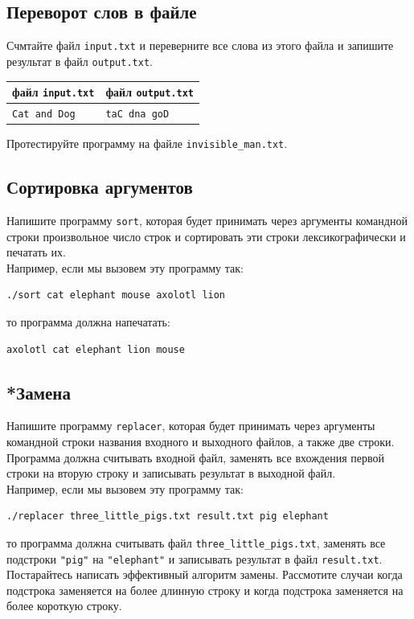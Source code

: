 \documentclass[10pt]{article}
\begin{document}
\subsection{Переворот слов в файле}
Счмтайте файл \texttt{input.txt}  и переверните все слова из этого файла и запишите результат в файл \texttt{output.txt}.
\begin{center} 
\begin{tabular}{ l | l }
 файл \texttt{input.txt} & файл \texttt{output.txt} \\ \hline
 \texttt{Cat and Dog} & \texttt{taC dna goD}\\
\end{tabular}
\end{center}
Протестируйте программу на файле \texttt{invisible\_man.txt}.


\subsection{Сортировка аргументов}
Напишите программу \texttt{sort}, которая будет принимать через аргументы командной строки произвольное число строк и сортировать эти строки лексикографически и печатать их.\\
Например, если мы вызовем эту программу так:
\begin{verbatim}
./sort cat elephant mouse axolotl lion
\end{verbatim}
то программа должна напечатать:
\begin{verbatim}
axolotl cat elephant lion mouse
\end{verbatim}




\subsection{*Замена}
Напишите программу \texttt{replacer}, которая будет принимать через аргументы командной строки названия входного и выходного файлов, а также две строки. Программа должна считывать входной файл, заменять все вхождения первой строки на вторую строку и записывать результат в выходной файл.\\
Например, если мы вызовем эту программу так:
\begin{verbatim}
./replacer three_little_pigs.txt result.txt pig elephant
\end{verbatim}
то программа должна считывать файл \texttt{three\_little\_pigs.txt}, заменять все подстроки \texttt{"pig"} на \texttt{"elephant"} и записывать результат в файл \texttt{result.txt}. Постарайтесь написать эффективный алгоритм замены. Рассмотите случаи когда подстрока заменяется на более длинную строку и когда подстрока заменяется на более короткую строку.
\end{document}
